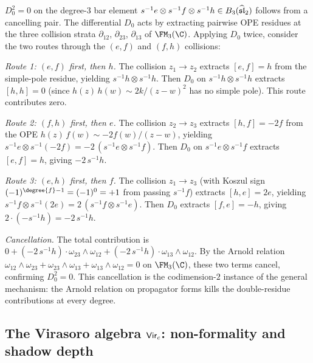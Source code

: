 \begin{verification}
\label{ver:sl2-codim2}
$D_0^2 = 0$ on the degree-$3$ bar element
$s^{-1}e \otimes s^{-1}f \otimes s^{-1}h \in B_3(\widehat{\mathfrak{sl}}_2)$
follows from a cancelling pair. The differential $D_0$ acts
by extracting pairwise OPE residues at the three collision
strata $\partial_{12}$, $\partial_{23}$, $\partial_{13}$ of
$\FM_3(\C)$. Applying $D_0$ twice, consider the two routes
through the $(e,f)$ and $(f,h)$ collisions:

\medskip\noindent
\emph{Route 1: $(e,f)$ first, then $h$.}
The collision $z_1 \to z_2$ extracts $[e,f] = h$ from the
simple-pole residue, yielding $s^{-1}h \otimes s^{-1}h$.
Then $D_0$ on $s^{-1}h \otimes s^{-1}h$ extracts
$[h,h] = 0$ (since $h(z)\,h(w) \sim 2k/(z-w)^2$ has no
simple pole). This route contributes zero.

\medskip\noindent
\emph{Route 2: $(f,h)$ first, then $e$.}
The collision $z_2 \to z_3$ extracts $[h,f] = -2f$ from the
OPE $h(z)\,f(w) \sim -2f(w)/(z-w)$, yielding
$s^{-1}e \otimes s^{-1}(-2f) = -2\,(s^{-1}e \otimes s^{-1}f)$.
Then $D_0$ on $s^{-1}e \otimes s^{-1}f$ extracts $[e,f] = h$,
giving $-2\,s^{-1}h$.

\medskip\noindent
\emph{Route 3: $(e,h)$ first, then $f$.}
The collision $z_1 \to z_3$ (with Koszul sign
$(-1)^{\degree{f}-1} = (-1)^{0} = +1$ from passing
$s^{-1}f$) extracts $[h,e] = 2e$, yielding
$s^{-1}f \otimes s^{-1}(2e) = 2\,(s^{-1}f \otimes s^{-1}e)$.
Then $D_0$ extracts $[f,e] = -h$, giving $2 \cdot (-s^{-1}h) =
-2\,s^{-1}h$.

\medskip\noindent
\emph{Cancellation.}
The total contribution is
$0 + (-2\,s^{-1}h) \cdot \omega_{23}\wedge\omega_{12}
+ (-2\,s^{-1}h) \cdot \omega_{13}\wedge\omega_{12}$.
By the Arnold relation
$\omega_{12}\wedge\omega_{23} + \omega_{23}\wedge\omega_{13}
+ \omega_{13}\wedge\omega_{12} = 0$
on $\FM_3(\C)$, these two terms cancel, confirming $D_0^2 = 0$.
This cancellation is the codimension-$2$ instance of the general
mechanism: the Arnold relation on propagator forms kills the
double-residue contributions at every degree.
\end{verification}


\subsection{The Virasoro algebra $\mathsf{Vir}_c$: non-formality
and shadow depth}
\label{subsec:example-virasoro}

